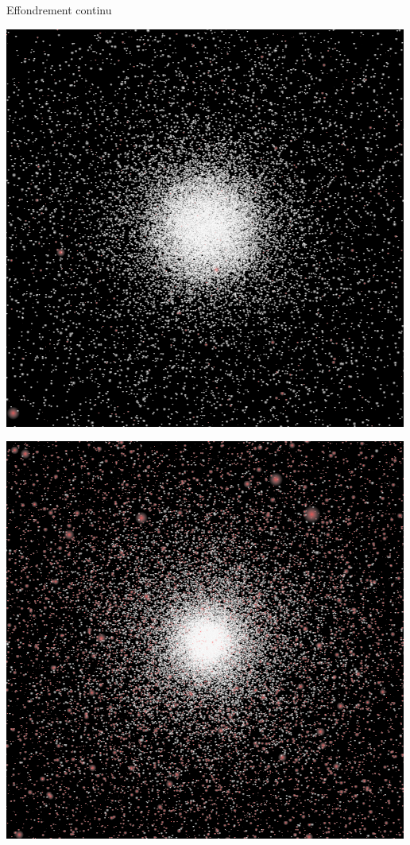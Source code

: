 \documentclass[slidetop,12pt,ucs]{beamer}
\renewcommand{\(}{\ensuremath{\left(}}
\renewcommand{\)}{\ensuremath{\right)}}
\begin{document}
			\begin{frame}[t]{Effondrement continu}
					\begin{minipage}{0.50\linewidth}
						\centering \includegraphics[width=\linewidth]{None_130.png}
					\end{minipage}\hfill
					\begin{minipage}{0.50\linewidth}
						\centering \includegraphics[width=\linewidth]{None_3000.png}
					\end{minipage}
			\end{frame}
\end{document}
